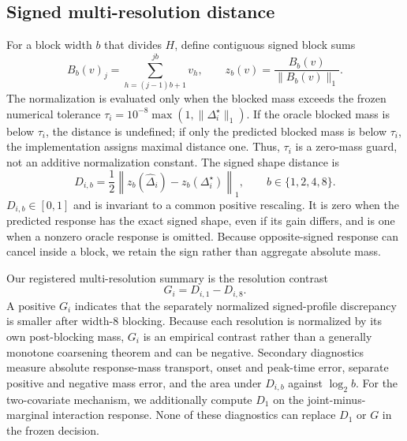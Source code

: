 \documentclass[conference]{IEEEtran}
\begin{document}
\subsection{Signed multi-resolution distance}

For a block width $b$ that divides $H$, define contiguous signed block sums
\begin{equation}
B_b(v)_j=\sum_{h=(j-1)b+1}^{jb}v_h,\qquad
z_b(v)=\frac{B_b(v)}{\|B_b(v)\|_1}.
\end{equation}
The normalization is evaluated only when the blocked mass exceeds the frozen numerical
tolerance $\tau_i=10^{-8}\max(1,\|\Delta_i^\star\|_1)$. If the oracle blocked mass is
below $\tau_i$, the distance is undefined; if only the predicted blocked mass is below
$\tau_i$, the implementation assigns maximal distance one. Thus, $\tau_i$ is a
zero-mass guard, not an additive normalization constant.
The signed shape distance is
\begin{equation}
D_{i,b}=\frac{1}{2}\left\|z_b(\widehat\Delta_i)-
z_b(\Delta_i^\star)\right\|_1,\qquad b\in\{1,2,4,8\}.
\label{eq:shape-distance}
\end{equation}
$D_{i,b}\in[0,1]$ and is invariant to a common positive rescaling. It is zero
when the predicted response has the exact signed shape, even if its gain differs, and
is one when a nonzero oracle response is omitted. Because opposite-signed response can
cancel inside a block, we retain the sign rather than aggregate absolute mass.

Our registered multi-resolution summary is the resolution contrast
\begin{equation}
G_i=D_{i,1}-D_{i,8}.
\label{eq:hidden-gap}
\end{equation}
A positive $G_i$ indicates that the separately normalized signed-profile discrepancy is
smaller after width-8 blocking. Because each resolution is normalized by its own
post-blocking mass, $G_i$ is an empirical contrast rather than a generally monotone
coarsening theorem and can be negative. Secondary diagnostics measure absolute response-mass transport,
onset and peak-time error, separate positive and negative mass error, and the area under
$D_{i,b}$ against $\log_2 b$. For the two-covariate mechanism, we additionally compute
$D_1$ on the joint-minus-marginal interaction response. None of these diagnostics can
replace $D_1$ or $G$ in the frozen decision.
\end{document}
